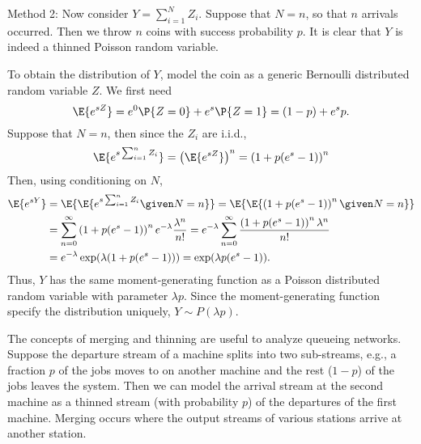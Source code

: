 \begin{exercise}
\begin{solution}
Method 2: Now consider $Y=\sum_{i=1}^N Z_i$. Suppose that $N=n$, so that $n$
arrivals occurred. Then we throw $n$ coins with success probability
$p$. It is clear that $Y$ is indeed a thinned Poisson random variable.

To obtain the distribution of $Y$, model the coin as a generic Bernoulli distributed random variable
$Z$.  We first need
\begin{equation*}
  \E{e^{s Z}} = e^0 \P{Z=0} + e^{s} \P{Z=1} = (1-p) + e^s p.
\end{equation*}
Suppose that $N=n$, then since the $Z_i$ are i.i.d.,
\begin{equation*}
\E{e^{s\sum_{i=1}^n Z_i}} = \left(\E{e^{s Z}}\right)^n = \left(1 + p (e^s - 1)\right)^n
\end{equation*}
Then, using conditioning on $N$, 
\begin{align*}
  \E{e^{s Y}}
&= \E{\E{e^{s\sum_{i=1}^n Z_i} \given N=n }} 
 = \E{\E{\left(1+p(e^s-1)\right)^n \given N=n }} \\
&= \sum_{n=0}^\infty \left(1+p(e^s-1)\right)^n e^{-\lambda} \frac{\lambda^n}{n!}
= e^{-\lambda} \sum_{n=0}^\infty \frac{\left(1+p(e^s-1)\right)^n \lambda^n}{n!}\\
&= e^{-\lambda} \exp(\lambda (1+p(e^s-1))) = \exp(\lambda p (e^s - 1)).
\end{align*}
Thus, $Y$ has the same moment-generating function as a Poisson
distributed random variable with parameter $\lambda p$. Since
the moment-generating function specify the distribution uniquely,
$Y\sim P(\lambda p)$.
\end{solution}
\end{exercise}    

The concepts of merging and thinning are  useful to analyze queueing
  networks. Suppose the departure stream of a machine splits into
  two sub-streams, e.g., a fraction $p$ of the jobs moves to on another
  machine and the rest ($1-p$) of the jobs leaves the system. Then we
  can model the arrival stream at the second machine as a thinned
  stream (with probability $p$) of the departures of the first
  machine. Merging occurs where the output streams of various stations arrive at another station. 





